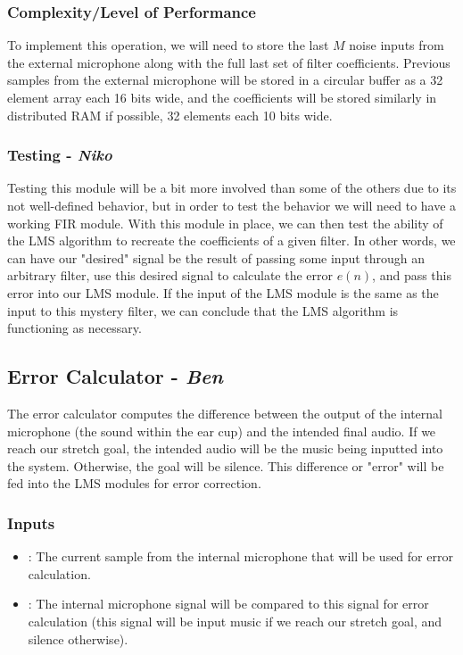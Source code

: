 \documentclass{fpgairpods}
\begin{document}
\begin{multicols*}{2}
\subsubsection{Complexity/Level of Performance}
To implement this operation, we will need to store the last $M$ noise inputs from the external microphone along with the full last set of filter coefficients. Previous samples from the external microphone will be stored in a circular buffer as a 32 element array each 16 bits wide, and the coefficients will be stored similarly in distributed RAM if possible, 32 elements each 10 bits wide.

\subsubsection{Testing - \textit{Niko}}
Testing this module will be a bit more involved than some of the others due to its not well-defined behavior, but in order to test the behavior we will need to have a working FIR module. With this module in place, we can then test the ability of the LMS algorithm to recreate the coefficients of a given filter. In other words, we can have our "desired" signal be the result of passing some input through an arbitrary filter, use this desired signal to calculate the error $e(n)$, and pass this error into our LMS module. If the input of the LMS module is the same as the input to this mystery filter, we can conclude that the LMS algorithm is functioning as necessary.

\subsection{Error Calculator - \textit{Ben}}
The error calculator computes the difference between the output of the internal microphone (the sound within the ear cup) and the intended final audio. If we reach our stretch goal, the intended audio will be the music being inputted into the system. Otherwise, the goal will be silence. This difference or "error" will be fed into the LMS modules for error correction.
\subsubsection{Inputs}
\begin{itemize}
    \item {}: The current sample from the internal microphone that will be used for error calculation.
    \item {}: The internal microphone signal will be compared to this signal for error calculation (this signal will be input music if we reach our stretch goal, and silence otherwise).
\end{itemize}

\end{multicols*}
\end{document}
